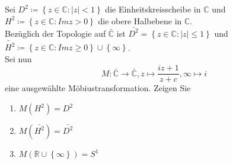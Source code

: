 \begin{assignment}
  Sei \( D^2 \coloneqq \left \{ z \in \mathbb{C} : \vert z \vert < 1 \right \} \) die Einheitskreisscheibe in \( \mathbb{C} \) und \( H^2 \coloneqq \left \{ z \in \mathbb{C} : Im z > 0 \right \} \) die obere Halbebene in \( \mathbb{C} \). \\
  Bezüglich der Topologie auf \( \bar{\mathbb{C}} \) ist \( \bar{ D^2 } = \left \{ z \in \mathbb{C} : \vert z \vert \leq 1 \right \} \) und \( \tilde{H^2} \coloneqq \left \{ z \in \mathbb{C} : Im z \geq 0 \right \} \cup \left \{ \infty \right \} \). \\
  Sei nun
  \begin{equation*}
    M: \bar{\mathbb{C}} \to \bar{\mathbb{C}}, z \mapsto \frac{iz + 1}{z + c}, \infty \mapsto i
  \end{equation*}
  eine ausgewählte Möbiustransformation. Zeigen Sie
  \begin{enumerate}[label= (\alph*)] 
    \item \( M(H^2) = D^2 \)
    \item \( M(\bar{ H^2 }) = \bar{ D^2 } \)
    \item \( M(\mathbb{R} \cup \left \{ \infty \right \}) = S^1 \)
  \end{enumerate}
\end{assignment}
